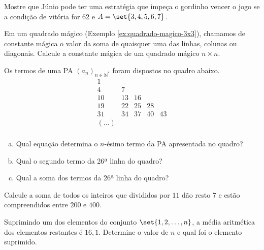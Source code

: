 

\begin{exercise}
    Mostre que Júnio pode ter uma estratégia que impeça o gordinho
vencer o jogo se a condição de vitória for 62 e $A =\set{3, 4, 5, 6,
7}$. 
\end{exercise}

\begin{exercise}
    Em um quadrado mágico (Exemplo \ref{ex:quadrado-magico-3x3}),
chamamos de constante mágica o valor da soma de quaisquer uma das
linhas, colunas ou diagonais. Calcule a constante mágica de um
quadrado mágico $n \times n$.
\end{exercise}

\begin{exercise}
    Os termos de uma PA $(a_n)_{n \in \mathbb N^*}$ foram dispostos no quadro abaixo.
       $$\begin{array}{ccccc}
        1&  &  &  &  \\
        4&  7&  &  &  \\
        10&  13&  16&  &  \\
        19&  22&  25&  28&  \\
        31&  34&  37&  40&  43\\
        (\dots)&  &  &  &  \\
       \end{array}$$  

    \begin{enumerate}[a)]
        \item Qual equação determina o $n$-ésimo termo da PA apresentada no quadro?
        \item Qual o segundo termo da 26ª linha do quadro? 
        \item Qual a soma dos termos da 26ª linha do quadro? 
     \end{enumerate}
\end{exercise}

\begin{exercise}
    Calcule a soma de todos os inteiros que divididos por $11$ dão resto $7$ e estão compreendidos entre $200$ e $400$.
\end{exercise}


\begin{exercise}
Suprimindo um dos elementos do conjunto $\set{1, 2, \dots , n}$,
a média aritmética dos elementos restantes é $16{,}1$. Determine o
valor de $n$ e qual foi o elemento suprimido.    
\end{exercise}

